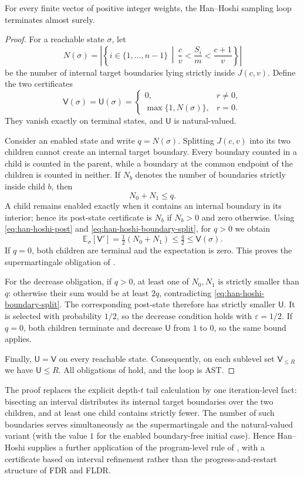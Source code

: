 \begin{theorem}
 \label{thm:han-hoshi}
For every finite vector of positive integer weights, the Han--Hoshi
sampling loop terminates almost surely.
\end{theorem}
\begin{proof}
For a reachable state $\sigma$, let
\[
 N(\sigma)
 =\left|\left\{i\in\{1,\ldots,n-1\}\,\middle|\,
 \frac cv<\frac{S_i}{m}<\frac{c+1}{v}\right\}\right|
\]
be the number of internal target boundaries lying strictly inside
$J(c,v)$.  Define the two certificates
\[
 \mathsf V(\sigma)=\mathsf U(\sigma)=
 \begin{cases}
 0,&r\ne0,\\
 \max\{1,N(\sigma)\},&r=0.
 \end{cases}
\]
They vanish exactly on terminal states, and $\mathsf U$ is
natural-valued.

Consider an enabled state and write $q=N(\sigma)$.  Splitting $J(c,v)$
into its two children cannot create an internal target boundary.  Every
boundary counted in a child is counted in the parent, while a boundary at
the common endpoint of the children is counted in neither.  If $N_b$
denotes the number of boundaries strictly inside child $b$, then
\begin{equation}
 N_0+N_1\le q.
 \label{eq:han-hoshi-boundary-split}
\end{equation}
A child remains enabled exactly when it contains an internal boundary in
its interior; hence its post-state certificate is $N_b$ if $N_b>0$ and
zero otherwise.  Using \eqref{eq:han-hoshi-post} and
\eqref{eq:han-hoshi-boundary-split}, for $q>0$ we obtain
\[
 \mathbb E_\sigma[\mathsf V']
 =\tfrac12(N_0+N_1)
 \le\tfrac q2
 \le \mathsf V(\sigma).
\]
If $q=0$, both children are terminal and the expectation is zero.  This
proves the supermartingale obligation of .

For the decrease obligation, if $q>0$, at least one of $N_0,N_1$ is
strictly smaller than $q$: otherwise their sum would be at least $2q$,
contradicting \eqref{eq:han-hoshi-boundary-split}.  The corresponding
post-state therefore has strictly smaller $\mathsf U$.  It is selected
with probability $1/2$, so the decrease condition holds with
$\varepsilon=1/2$.  If $q=0$, both children terminate and decrease
$\mathsf U$ from $1$ to $0$, so the same bound applies.

Finally, $\mathsf U=\mathsf V$ on every reachable state.  Consequently,
on each sublevel set $\mathsf V_{\le R}$ we have
$\mathsf U\le R$.  All obligations of  hold, and
the loop is AST.
\end{proof}

The proof replaces the explicit depth-$t$ tail calculation by one
iteration-level fact: bisecting an interval distributes its internal
target boundaries over the two children, and at least one child contains
strictly fewer.  The number of such boundaries serves simultaneously as
the supermartingale and the natural-valued variant (with the value $1$
for the enabled boundary-free initial case).  Hence Han--Hoshi supplies a further application of the
program-level rule of , with a certificate based on
interval refinement rather than the progress-and-restart structure of
FDR and FLDR.
